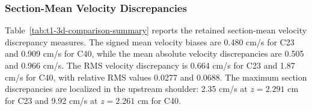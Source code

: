 \subsubsection{Section-Mean Velocity Discrepancies}
\label{subsec:section-mean-velocity-discrepancies}

Table~\ref{tab:t1-3d-comparison-summary} reports the retained section-mean
velocity discrepancy measures. The signed mean velocity biases are 0.480 cm/s
for C23 and 0.909 cm/s for C40, while the mean absolute velocity discrepancies
are 0.505 and 0.966 cm/s. The RMS velocity discrepancy is 0.664 cm/s for C23
and 1.87 cm/s for C40, with relative RMS values 0.0277 and 0.0688. The maximum
section discrepancies are localized in the upstream shoulder: 2.35 cm/s at
$z=2.291$ cm for C23 and 9.92 cm/s at $z=2.261$ cm for C40.

\begin{table}[!htb]
    \centering
    \scriptsize
    \caption{Quadrature-backed section-mean velocity discrepancy summary at the
    matched $0.9995$ s final-time sample. These are single-realization
    descriptors in cm/s except for the final axial-location column in cm. Angle
    brackets denote axial sample means over the 200 retained comparison
    sections, not temporal averages or inner products.}
    \label{tab:t1-3d-comparison-summary}
    {\setlength{\tabcolsep}{1.8pt}
    }
\end{table}


